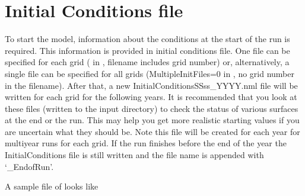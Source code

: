 \documentclass[letterpaper,10pt,english]{sphinxmanual}
\begin{document}
\section{Initial Conditions file}
\label{\detokenize{input_files/Initial_Conditions/Initial_Conditions::doc}}\label{\detokenize{input_files/Initial_Conditions/Initial_Conditions:initial-conditions}}\label{\detokenize{input_files/Initial_Conditions/Initial_Conditions:initial-conditions-file}}
To start the model, information about the conditions at the start of the
run is required. This information is provided in initial conditions
file. One file can be specified for each grid
({\hyperref[\detokenize{input_files/RunControl/File_related_options:cmdoption-arg-multipleinitfiles}]{}} in
{\hyperref[\detokenize{input_files/RunControl/RunControl:runcontrol-nml}]{}}, filename includes grid number) or,
alternatively, a single file can be specified for all grids
(MultipleInitFiles=0 in {\hyperref[\detokenize{input_files/RunControl/RunControl:runcontrol-nml}]{}}, no grid
number in the filename). After that, a new
InitialConditionsSSss\_YYYY.nml file will be written for each grid for
the following years. It is recommended that you look at these files
(written to the input directory) to check the status of various surfaces
at the end or the run. This may help you get more realistic starting
values if you are uncertain what they should be. Note this file will be
created for each year for multiyear runs for each grid. If the run
finishes before the end of the year the InitialConditions file is still
written and the file name is appended with ‘\_EndofRun’.

A sample file of  looks like

%
\begin{sphinxVerbatim}[commandchars=\\\{\}]
\end{sphinxVerbatim}
\end{document}
